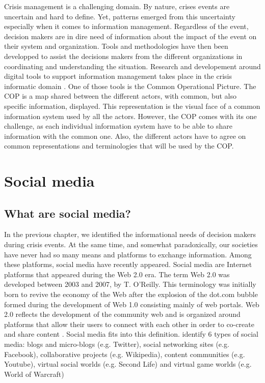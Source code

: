 Crisis management is a challenging domain.
By nature, crises events are uncertain and hard to define.
Yet, patterns emerged from this uncertainty especially when it comes to information management.
Regardless of the event, decision makers are in dire need of information about the impact of the event on their system and organization.
Tools and methodologies have then been developped to assist the decisions makers from the different organizations in coordinating and understanding the situation.
Research and developement around digital tools to support information management takes place in the crisis informatic domain \cite{palenCrisisInformaticsHumancentered2020}.
One of those tools is the Common Operational Picture.
The COP is a map shared between the different actors, with common, but also specific information, displayed.
This representation is the visual face of a common information system used by all the actors.
However, the COP comes with its one challenge, as each individual information system have to be able to share information with the common one.
Also, the different actors have to agree on common representations and terminologies that will be used by the COP.

\section{Social media}
\subsection{What are social media?}
In the previous chapter, we identified the informational needs of decision makers during crisis events.
At the same time, and somewhat paradoxically, our societies have never had so many means and platforms to exchange information.
Among these platforms, social media have recently appeared.
Social media are Internet platforms that appeared during the Web 2.0 era.
The term Web 2.0 was developed between 2003 and 2007, by T. O'Reilly.
This terminology was initially born to revive the economy of the Web after the explosion of the dot.com bubble formed during the development of Web 1.0 consisting mainly of web portals.
Web 2.0 reflects the development of the community web and is organized around platforms that allow their users to connect with each other in order to co-create and share content \cite{oreillyWhatWebDesign2007b}.
Social media fits into this definition.
\cite{kaplanUsersWorldUnite2010a} identify 6 types of social media: blogs and micro-blogs (e.g. Twitter), social networking sites (e.g. Facebook), collaborative projects (e.g. Wikipedia), content communities (e.g. Youtube), virtual social worlds (e.g. Second Life) and virtual game worlds (e.g. World of Warcraft)

